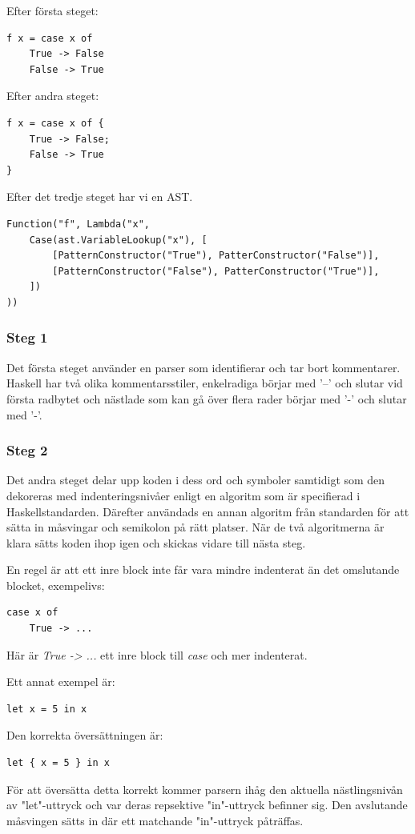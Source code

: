 Efter första steget:
\begin{lstlisting}
f x = case x of
    True -> False
    False -> True
\end{lstlisting}

Efter andra steget:
\begin{lstlisting}
f x = case x of {
    True -> False;
    False -> True
}
\end{lstlisting}

Efter det tredje steget har vi en AST.
\begin{lstlisting}
Function("f", Lambda("x", 
    Case(ast.VariableLookup("x"), [
        [PatternConstructor("True"), PatterConstructor("False")],
        [PatternConstructor("False"), PatterConstructor("True")],
    ])
))
\end{lstlisting}

\subsubsection{Steg 1}
Det första steget använder en parser som identifierar och tar bort kommentarer. 
Haskell har två olika kommentarsstiler, enkelradiga börjar med '--' och slutar vid första radbytet och 
nästlade som kan gå över flera rader börjar med '{-' och slutar med '-}'.

\subsubsection{Steg 2}
Det andra steget delar upp koden i dess ord och symboler samtidigt som den dekoreras med indenteringsnivåer enligt en algoritm 
som är specifierad i Haskellstandarden. Därefter användads en annan algoritm från standarden för att sätta in måsvingar och semikolon på rätt platser. 
När de två algoritmerna är klara sätts koden ihop igen och skickas vidare till nästa steg.

En regel är att ett inre block inte får vara mindre indenterat än det omslutande blocket, exempelivs:
\begin{lstlisting}
case x of
    True -> ...
\end{lstlisting}
Här är \emph{True -> ...} ett inre block till \emph{case} och mer indenterat.

Ett annat exempel är:
\begin{lstlisting}
let x = 5 in x
\end{lstlisting}
Den korrekta översättningen är:
\begin{lstlisting}
let { x = 5 } in x
\end{lstlisting}
För att översätta detta korrekt kommer parsern ihåg den aktuella nästlingsnivån av "let"-uttryck och var deras repsektive "in"-uttryck befinner sig. 
Den avslutande måsvingen sätts in där ett matchande "in"-uttryck påträffas.

